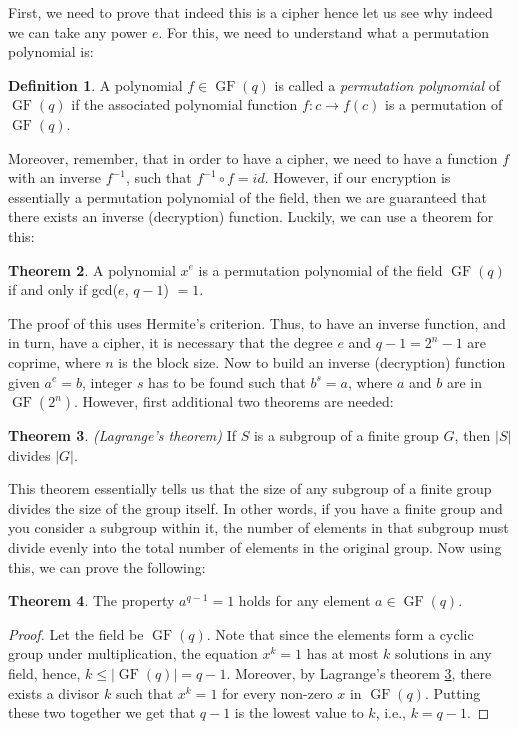 \documentclass{Resources/UoBLab1}
\theoremstyle{definition}
\newtheorem{theorem}{Theorem}[section]
\newtheorem{definition}[theorem]{Definition}
\begin{document}
First, we need to prove that indeed this is a cipher hence let us see why indeed we can take any power $e$. For this, we need to understand what a permutation polynomial is:
\begin{definition}
    A polynomial $f \in \operatorname{GF}(q)$ is called a \textit{permutation polynomial} of $\operatorname{GF}(q)$ if the associated polynomial function $f : c \to f(c)$ is a permutation of $\operatorname{GF}(q)$.
\end{definition}
Moreover, remember, that in order to have a cipher, we need to have a function $f$ with an inverse $f^{-1}$, such that $f^{-1} \circ f = id$. However, if our encryption is essentially a permutation polynomial of the field, then we are guaranteed that there exists an inverse (decryption) function. Luckily, we can use a theorem for this:
\begin{theorem}
    A polynomial $x^e$ is a permutation polynomial of the field $\operatorname{GF}(q)$ if and only if gcd($e$, $q - 1$) $= 1$.
\end{theorem}
The proof of this uses Hermite's criterion\cite{PPIntro}. Thus, to have an inverse function, and in turn, have a cipher, it is necessary that the degree $e$ and $q - 1 = 2^n - 1$ are coprime, where $n$ is the block size. Now to build an inverse (decryption) function given $a^e = b$, integer $s$ has to be found such that $b^s = a$, where $a$ and $b$ are in $\operatorname{GF}(2^n)$. However, first additional two theorems are needed:
\begin{theorem}\label{thm:Lagrange}
    \textit{(Lagrange's theorem)} If $S$ is a subgroup of a finite group $G$, then $|S|$ divides $|G|$.
\end{theorem}
This theorem essentially tells us that the size of any subgroup of a finite group divides the size of the group itself. In other words, if you have a finite group and you consider a subgroup within it, the number of elements in that subgroup must divide evenly into the total number of elements in the original group. Now using this, we can prove the following:
\begin{theorem}\label{thm:GroupProp}
    The property $a^{q-1} = 1$ holds for any element $a \in \operatorname{GF}(q)$.
\end{theorem}
\begin{proof}
    Let the field be $\operatorname{GF}(q)$. Note that since the elements form a cyclic group under multiplication, the equation $x^k = 1$ has at most $k$ solutions in any field, hence, $k \le |\operatorname{GF}(q)| = q - 1$. Moreover, by Lagrange's theorem \ref{thm:Lagrange}, there exists a divisor $k$ such that $x^k = 1$ for every non-zero $x$ in $\operatorname{GF}(q)$. Putting these two together we get that $q-1$ is the lowest value to $k$, i.e., $k = q - 1$.
\end{proof}
\end{document}

